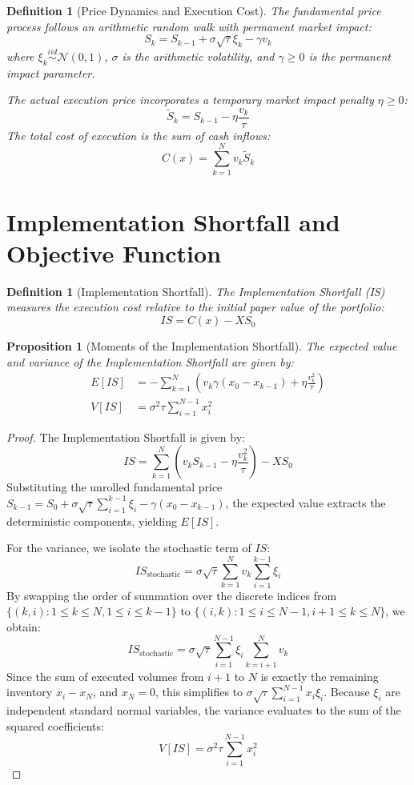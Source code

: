 \documentclass[11pt,a4paper]{article}
\newtheorem{proposition}[theorem]{Proposition}
\newtheorem{definition}[theorem]{Definition}
\begin{document}
\begin{definition}[Price Dynamics and Execution Cost]
The fundamental price process follows an arithmetic random walk with permanent market impact:
\[ S_k = S_{k-1} + \sigma \sqrt{\tau} \xi_k - \gamma v_k \]
where $\xi_k \overset{iid}{\sim} \mathcal{N}(0, 1)$, $\sigma$ is the arithmetic volatility, and $\gamma \geq 0$ is the permanent impact parameter.

The actual execution price incorporates a temporary market impact penalty $\eta \geq 0$:
\[ \tilde{S}_k = S_{k-1} - \eta \frac{v_k}{\tau} \]
The total cost of execution is the sum of cash inflows:
\[ C(x) = \sum_{k=1}^{N} v_k \tilde{S}_k \]
\end{definition}

\section{Implementation Shortfall and Objective Function}

\begin{definition}[Implementation Shortfall]
The Implementation Shortfall (IS) measures the execution cost relative to the initial paper value of the portfolio:
\[ IS = C(x) - X S_0 \]
\end{definition}

\begin{proposition}[Moments of the Implementation Shortfall]
The expected value and variance of the Implementation Shortfall are given by:
\begin{align*}
E[IS] &= - \sum_{k=1}^{N} \left( v_k \gamma (x_0 - x_{k-1}) + \eta \frac{v_k^2}{\tau} \right) \\
V[IS] &= \sigma^2 \tau \sum_{i=1}^{N-1} x_i^2
\end{align*}
\end{proposition}

\begin{proof}
The Implementation Shortfall is given by:
\[ IS = \sum_{k=1}^{N} \left( v_k S_{k-1} - \eta \frac{v_k^2}{\tau} \right) - X S_0 \]
Substituting the unrolled fundamental price $S_{k-1} = S_0 + \sigma \sqrt{\tau} \sum_{i=1}^{k-1} \xi_i - \gamma(x_0 - x_{k-1})$, the expected value extracts the deterministic components, yielding $E[IS]$.

For the variance, we isolate the stochastic term of $IS$:
\[ IS_{\text{stochastic}} = \sigma \sqrt{\tau} \sum_{k=1}^{N} v_k \sum_{i=1}^{k-1} \xi_i \]
By swapping the order of summation over the discrete indices from $\{(k,i) : 1 \le k \le N, 1 \le i \le k-1\}$ to $\{(i,k) : 1 \le i \le N-1, i+1 \le k \le N\}$, we obtain:
\[ IS_{\text{stochastic}} = \sigma \sqrt{\tau} \sum_{i=1}^{N-1} \xi_i \sum_{k=i+1}^{N} v_k \]
Since the sum of executed volumes from $i+1$ to $N$ is exactly the remaining inventory $x_i - x_N$, and $x_N = 0$, this simplifies to $\sigma \sqrt{\tau} \sum_{i=1}^{N-1} x_i \xi_i$. Because $\xi_i$ are independent standard normal variables, the variance evaluates to the sum of the squared coefficients:
\[ V[IS] = \sigma^2 \tau \sum_{i=1}^{N-1} x_i^2 \]
\end{proof}
\end{document}
